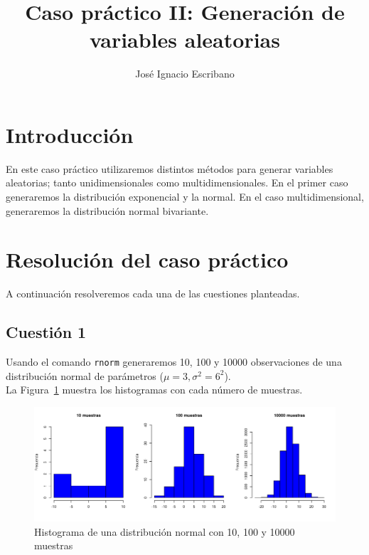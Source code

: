 \documentclass[12pt,a4paper,twoside,openright,titlepage,final]{article}
\author{José Ignacio Escribano}
\title{Caso práctico II: Generación de variables aleatorias}
\begin{document}
\setcounter{page}{1}


\listoftables
\thispagestyle{empty}
\newpage

\listoffigures
\thispagestyle{empty}
\newpage

\tableofcontents
\thispagestyle{empty}
\newpage


\setcounter{page}{1}

\section{Introducción}

En este caso práctico utilizaremos distintos métodos para generar variables aleatorias; tanto unidimensionales como multidimensionales. En el primer caso generaremos la distribución exponencial y la normal. En el caso multidimensional, generaremos la distribución normal bivariante.

\section{Resolución del caso práctico}

A continuación resolveremos cada una de las cuestiones planteadas.

\subsection{Cuestión 1}\label{cuestion:1}

Usando el comando \texttt{rnorm} generaremos 10, 100 y 10000 observaciones de una distribución normal de parámetros ($\mu = 3, \sigma^2 = 6^2$).\\

La Figura~\ref{fig:Rplot} muestra los histogramas con cada número de muestras.\\

\begin{figure}[htbp!]
\centering
\includegraphics[width=0.8\linewidth]{imagenes/Rplot}
\caption{Histograma de una distribución normal con 10, 100 y 10000 muestras}
\label{fig:Rplot}
\end{figure}
\end{document}
